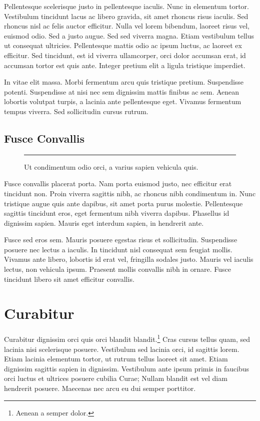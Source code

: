 \documentclass[dissertation]{msudissertation}
\begin{document}
Pellentesque scelerisque justo in pellentesque iaculis. Nunc in elementum tortor. Vestibulum tincidunt lacus ac libero gravida, sit amet rhoncus risus iaculis. Sed rhoncus nisl ac felis auctor efficitur. Nulla vel lorem bibendum, laoreet risus vel, euismod odio. Sed a justo augue. Sed sed viverra magna. Etiam vestibulum tellus ut consequat ultricies. Pellentesque mattis odio ac ipsum luctus, ac laoreet ex efficitur. Sed tincidunt, est id viverra ullamcorper, orci dolor accumsan erat, id accumsan tortor est quis ante. Integer pretium elit a ligula tristique imperdiet.

In vitae elit massa. Morbi fermentum arcu quis tristique pretium. Suspendisse potenti. Suspendisse at nisi nec sem dignissim mattis finibus ac sem. Aenean lobortis volutpat turpis, a lacinia ante pellentesque eget. Vivamus fermentum tempus viverra. Sed sollicitudin cursus rutrum. \cite{exampleref2}

\subsection{Fusce Convallis}

\begin{figure}
  \centering
  \rule{5cm}{3cm}
  \caption{Ut condimentum odio orci, a varius sapien vehicula quis.}
\end{figure}

Fusce convallis placerat porta. Nam porta euismod justo, nec efficitur erat tincidunt non. Proin viverra sagittis nibh, ac rhoncus nibh condimentum in. Nunc tristique augue quis ante dapibus, sit amet porta purus molestie. Pellentesque sagittis tincidunt eros, eget fermentum nibh viverra dapibus. Phasellus id dignissim sapien. Mauris eget interdum sapien, in hendrerit ante.

Fusce sed eros sem. Mauris posuere egestas risus et sollicitudin. Suspendisse posuere nec lectus a iaculis. In tincidunt nisl consequat sem feugiat mollis. Vivamus ante libero, lobortis id erat vel, fringilla sodales justo. Mauris vel iaculis lectus, non vehicula ipsum. Praesent mollis convallis nibh in ornare. Fusce tincidunt libero sit amet efficitur convallis.

\section{Curabitur}

Curabitur dignissim orci quis orci blandit blandit.\footnote{Aenean a semper dolor.} Cras cursus tellus quam, sed lacinia nisi scelerisque posuere. Vestibulum sed lacinia orci, id sagittis lorem. Etiam lacinia elementum tortor, ut rutrum tellus laoreet sit amet. Etiam dignissim sagittis sapien in dignissim. Vestibulum ante ipsum primis in faucibus orci luctus et ultrices posuere cubilia Curae; Nullam blandit est vel diam hendrerit posuere. Maecenas nec arcu eu dui semper porttitor.
\end{document}
